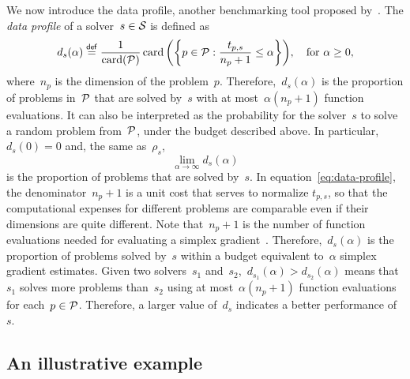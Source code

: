 We now introduce the data profile, another benchmarking tool proposed by~\cite{More_Wild_2009}.
The \emph{data profile} of a solver~$s \in \mathcal{S}$ is defined as
\begin{equation}
    \label{eq:data-profile}
    d_s(\alpha) \eqdef \frac{1}{\card(\xpb)} \card \bigg(\set[\bigg]{p \in \xpb : \frac{t_{p, s}}{n_p + 1} \le \alpha}\bigg), \quad \text{for~$\alpha \ge 0$},
\end{equation}
where~$n_p$ is the dimension of the problem~$p$.
Therefore,~$d_s(\alpha)$ is the proportion of problems in~$\mathcal{P}$ that are solved by~$s$ with at most~$\alpha (n_p + 1)$ function evaluations.
It can also be interpreted as the probability for the solver~$s$ to solve a random problem from~$\mathcal{P}$, under the budget described above.
In particular,~$d_s(0) = 0$ and, the same as~$\rho_s$,
\begin{equation*}
    \lim_{\alpha \to \infty} d_s(\alpha)
\end{equation*}
is the proportion of problems that are solved by~$s$.
In equation~\cref{eq:data-profile}, the denominator~$n_p + 1$ is a unit cost that serves to normalize $t_{p, s}$, so that the computational expenses for different problems are comparable even if their dimensions are quite different.
Note that~$n_p + 1$ is the number of function evaluations needed for evaluating a simplex gradient~\cite{Bortz_Kelley_1998}.
Therefore,~$d_s(\alpha)$ is the proportion of problems solved by~$s$ within a budget equivalent to~$\alpha$ simplex gradient estimates.
Given two solvers~$s_1$ and~$s_2$,~$d_{s_1}(\alpha) > d_{s_2}(\alpha)$ means that~$s_1$ solves more problems than~$s_2$ using at most~$\alpha (n_p + 1)$ function evaluations for each~$p \in \mathcal{P}$.
Therefore, a larger value of~$d_s$ indicates a better performance of~$s$.

\subsection{An illustrative example}
\label{subsec:profiles-example}

